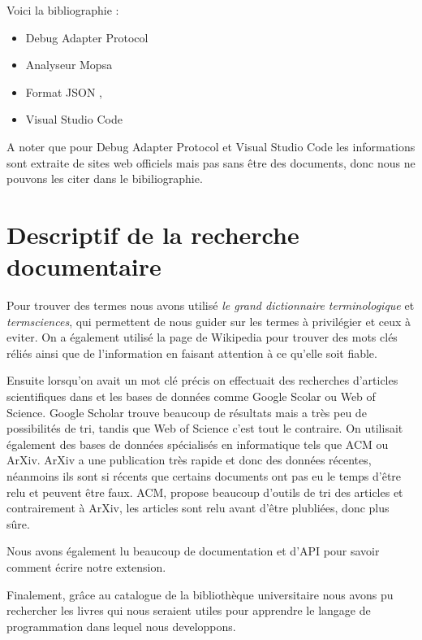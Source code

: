 \documentclass[french]{article}
\begin{document}
Voici la bibliographie : 
\begin{itemize}
\item Debug Adapter Protocol 
\item Analyseur Mopsa \cite{caires_abstract_2019}\cite{rival_static_2016}\cite{delmas_analysis_nodate}\cite{chakraborty_combinations_2020}
\item Format JSON \cite{langdale_parsing_2019},\cite{JavaScriptBook}
\item Visual Studio Code 
\newline
\end{itemize}

 A noter que pour Debug Adapter Protocol et Visual Studio Code les informations sont extraite de sites web officiels mais pas sans être des documents, donc nous ne pouvons les citer dans le bibiliographie. 

\section{Descriptif de la recherche documentaire}
\label{sec:others}
Pour trouver des termes nous avons utilisé \emph{le grand dictionnaire terminologique} et \emph{termsciences}, qui permettent de nous guider sur les termes à privilégier et ceux à eviter. On a également utilisé la page de Wikipedia pour trouver des mots clés réliés ainsi que de l'information en faisant attention à ce qu'elle soit fiable.

Ensuite lorsqu'on avait un mot clé précis on effectuait des recherches d'articles scientifiques dans et les bases de données comme Google Scolar ou Web of Science. Google Scholar trouve beaucoup de résultats mais a très peu de possibilités de tri, tandis que Web of Science c'est tout le contraire. On utilisait également des bases de données spécialisés en informatique tels que ACM ou ArXiv. ArXiv a une publication très rapide et donc des données récentes, néanmoins ils sont si récents que certains documents ont pas eu le temps d'être relu et peuvent être faux.  ACM, propose beaucoup d'outils de tri des articles et contrairement à ArXiv, les articles sont relu avant d'être plubliées, donc plus sûre. 

Nous avons également lu beaucoup de documentation et d'API pour savoir comment écrire notre extension. 

Finalement, grâce au catalogue de la bibliothèque universitaire nous avons pu rechercher les livres qui nous seraient utiles pour apprendre le langage de programmation dans lequel nous developpons. 
\end{document}
